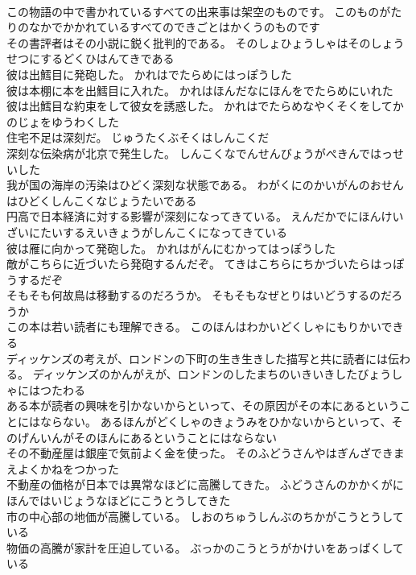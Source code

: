 \documentclass[8pt]{extreport}
\begin{document}
\begin{CJK}{UTF8}{min}
\\	この物語の中で書かれているすべての出来事は架空のものです。	このものがたりのなかでかかれているすべてのできごとはかくうのものです 
\\	その書評者はその小説に鋭く批判的である。	そのしょひょうしゃはそのしょうせつにするどくひはんてきである 
\\	彼は出鱈目に発砲した。	かれはでたらめにはっぽうした 
\\	彼は本棚に本を出鱈目に入れた。	かれはほんだなにほんをでたらめにいれた 
\\	彼は出鱈目な約束をして彼女を誘惑した。	かれはでたらめなやくそくをしてかのじょをゆうわくした 
\\	住宅不足は深刻だ。	じゅうたくぶそくはしんこくだ 
\\	深刻な伝染病が北京で発生した。	しんこくなでんせんびょうがぺきんではっせいした 
\\	我が国の海岸の汚染はひどく深刻な状態である。	わがくにのかいがんのおせんはひどくしんこくなじょうたいである 
\\	円高で日本経済に対する影響が深刻になってきている。	えんだかでにほんけいざいにたいするえいきょうがしんこくになってきている 
\\	彼は雁に向かって発砲した。	かれはがんにむかってはっぽうした 
\\	敵がこちらに近づいたら発砲するんだぞ。	てきはこちらにちかづいたらはっぽうするだぞ 
\\	そもそも何故鳥は移動するのだろうか。	そもそもなぜとりはいどうするのだろうか 
\\	この本は若い読者にも理解できる。	このほんはわかいどくしゃにもりかいできる 
\\	ディッケンズの考えが、ロンドンの下町の生き生きした描写と共に読者には伝わる。	ディッケンズのかんがえが、ロンドンのしたまちのいきいきしたびょうしゃにはつたわる 
\\	ある本が読者の興味を引かないからといって、その原因がその本にあるということにはならない。	あるほんがどくしゃのきょうみをひかないからといって、そのげんいんがそのほんにあるということにはならない 
\\	その不動産屋は銀座で気前よく金を使った。	そのふどうさんやはぎんざできまえよくかねをつかった 
\\	不動産の価格が日本では異常なほどに高騰してきた。	ふどうさんのかかくがにほんではいじょうなほどにこうとうしてきた 
\\	市の中心部の地価が高騰している。	しおのちゅうしんぶのちかがこうとうしている 
\\	物価の高騰が家計を圧迫している。	ぶっかのこうとうがかけいをあっぱくしている 

\end{CJK}
\end{document}
